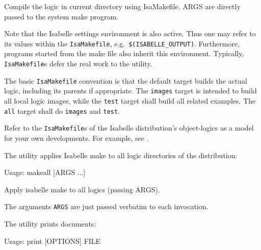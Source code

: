 \begin{isabellebody}
\begin{isamarkuptext}
\begin{ttbox}
  Compile the logic in current directory using IsaMakefile.
  ARGS are directly passed to the system make program.
\end{ttbox}

  Note that the Isabelle settings environment is also active. Thus one
  may refer to its values within the \verb|IsaMakefile|, e.g.\
  \verb|$(ISABELLE_OUTPUT)|. Furthermore, programs started from
  the make file also inherit this environment.  Typically, \verb|IsaMakefile|s defer the real work to the \hyperlink{tool.usedir}{\mbox{}} utility.

  \medskip The basic \verb|IsaMakefile| convention is that the
  default target builds the actual logic, including its parents if
  appropriate.  The \verb|images| target is intended to build all
  local logic images, while the \verb|test| target shall build
  all related examples.  The \verb|all| target shall do
  \verb|images| and \verb|test|.%
\end{isamarkuptext}%
\isamarkuptrue%
%
\isamarkuptrue%
%
\begin{isamarkuptext}%
Refer to the \verb|IsaMakefile|s of the Isabelle distribution's
  object-logics as a model for your own developments.  For example,
  see \hyperlink{file.~~/src/FOL/IsaMakefile}{\mbox{}}.%
\end{isamarkuptext}%
\isamarkuptrue%
%
\isamarkuptrue%
%
\begin{isamarkuptext}%
The \indexdef{}{tool}{makeall}\hypertarget{tool.makeall}{\hyperlink{tool.makeall}{\mbox{\isa{\isatt{makeall}}}}} utility applies Isabelle make to all logic
  directories of the distribution:
\begin{ttbox}
Usage: makeall [ARGS ...]

  Apply isabelle make to all logics (passing ARGS).
\end{ttbox}

  The arguments \verb|ARGS| are just passed verbatim to each
  \hyperlink{tool.make}{\mbox{}} invocation.%
\end{isamarkuptext}%
\isamarkuptrue%
%
\isamarkuptrue%
%
\begin{isamarkuptext}%
The \hypertarget{tool.print}{\hyperlink{tool.print}{\mbox{}}} utility prints documents:
\begin{ttbox}
Usage: print [OPTIONS] FILE


\end{ttbox}
\end{isamarkuptext}
\end{isabellebody}
